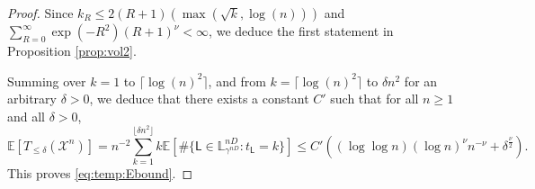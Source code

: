 \documentclass[11pt]{article}
\begin{document}
\begin{proof}
    Since $k_R\leq 2 (R+1)(\max(\sqrt{k},\log(n) ))$ and $\sum_{R=0}^\infty   \exp(-R^2) (R+1)^\nu<\infty$, we deduce the first statement in Proposition \ref{prop:vol2}.
    
    Summing over $k=1$ to $\lceil \log(n)^2 \rceil$, and from $k=\lceil \log(n)^2 \rceil$ to $\delta n^2$ for an arbitrary $\delta>0$,
    we deduce that there exists a constant $C'$ such that for all $n\geq 1$ and all $\delta>0$,
    \[
    \mathbb{E}[T_{\leq \delta}(\mathcal{X}^n)]
    =n^{-2}
    \sum_{k=1}^{\lfloor \delta n^2 \rfloor}  k \mathbb{E}[\# \{  \mathsf{L}\in \mathbb{L}^{nD}_{\gamma^{nD}}: t_{\mathsf{L}}=k  \}]
    \leq C' ((\log\log n) (\log n)^\nu n^{-\nu}+ \delta^{\frac{\nu}{2}}).
    \]
    This proves \eqref{eq:temp:Ebound}.
\end{proof}
\end{document}
